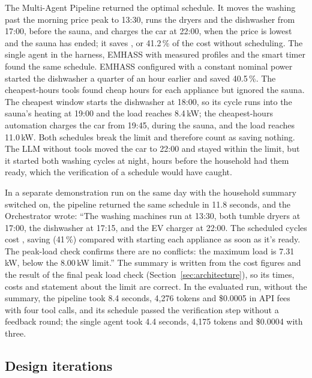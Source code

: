 \documentclass[12pt,a4paper]{report}
\begin{document}
The Multi-Agent Pipeline returned the optimal schedule. It moves the
washing past the morning price peak to 13:30, runs the dryers and the
dishwasher from 17:00, before the sauna, and charges the car at 22:00,
when the price is lowest and the sauna has ended; it saves ,
or 41.2\,\% of the cost without scheduling. The single agent in the
harness, EMHASS with measured profiles and the smart timer found the same
schedule. EMHASS configured with a constant nominal power started the
dishwasher a quarter of an hour earlier and saved 40.5\,\%. The
cheapest-hours tools found cheap hours for each appliance but ignored
the sauna. The cheapest window starts the dishwasher at 18:00, so its
cycle runs into the sauna's heating at 19:00 and the load reaches
8.4\,kW; the cheapest-hours automation charges the car from 19:45,
during the sauna, and the load reaches 11.0\,kW. Both schedules break
the limit and therefore count as saving nothing. The LLM without tools
moved the car to 22:00 and stayed within the limit, but it started both
washing cycles at night, hours before the household had them ready,
which the verification of a schedule would have caught.

In a separate demonstration run on the same day with the household
summary switched on, the pipeline returned the same schedule in 11.8
seconds, and the Orchestrator wrote: ``The washing machines run at
13:30, both tumble dryers at 17:00, the dishwasher at 17:15, and the EV
charger at 22:00. The scheduled cycles cost , saving
 (41\,\%) compared with starting each appliance as soon as
it's ready. The peak-load check confirms there are no conflicts: the
maximum load is 7.31\,kW, below the 8.00\,kW limit.'' The summary is
written from the cost figures and the result of the final peak load
check (Section~\ref{sec:architecture}), so its times, costs and
statement about the limit are correct. In the evaluated run, without
the summary, the pipeline took 8.4 seconds, 4,276 tokens and
\$0.0005 in API fees with four tool calls, and its schedule passed the
verification step without a feedback round; the single agent took 4.4
seconds, 4,175 tokens and \$0.0004 with three.

\subsection{Design iterations}
\label{sec:iterations}
\end{document}
